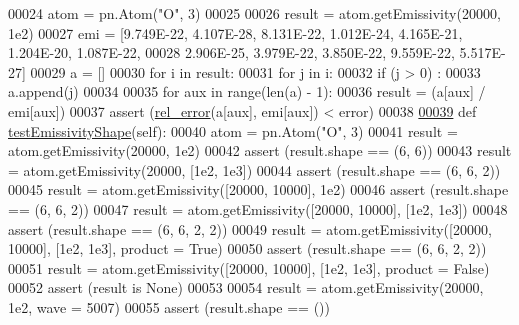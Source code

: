 \begin{DoxyCode}
00024                 atom = pn.Atom(\textcolor{stringliteral}{"O"}, 3)
00025 
00026                 result = atom.getEmissivity(20000, 1e2)
00027                 emi = [9.749E-22, 4.107E-28, 8.131E-22, 1.012E-24, 4.165E-21, 1.204E-20, 1.087E-22, 
00028                         2.906E-25, 3.979E-22, 3.850E-22, 9.559E-22, 5.517E-27]
00029                 a = []
00030                 \textcolor{keywordflow}{for} i \textcolor{keywordflow}{in} result:
00031                         \textcolor{keywordflow}{for} j \textcolor{keywordflow}{in} i:
00032                                 \textcolor{keywordflow}{if} (j > 0) :
00033                                         a.append(j)
00034 
00035                 \textcolor{keywordflow}{for} aux \textcolor{keywordflow}{in} range(len(a) - 1):
00036                         result = (a[aux] / emi[aux])
00037                         \textcolor{keyword}{assert} (\hyperlink{namespacepyneb_1_1test_1_1unit_test_aff3b7f847905c444d8b10727f10de236}{rel\_error}(a[aux], emi[aux]) < error)
00038         
\hypertarget{unit_test_8py_source_l00039}{}\hyperlink{classpyneb_1_1test_1_1unit_test_1_1_unit_test_ab23d15a37a34d1439ff2854ac602c8d1}{00039}         \textcolor{keyword}{def }\hyperlink{classpyneb_1_1test_1_1unit_test_1_1_unit_test_ab23d15a37a34d1439ff2854ac602c8d1}{testEmissivityShape}(self):
00040                 atom = pn.Atom(\textcolor{stringliteral}{"O"}, 3)
00041                 result = atom.getEmissivity(20000, 1e2)
00042                 \textcolor{keyword}{assert} (result.shape == (6, 6))
00043                 result = atom.getEmissivity(20000, [1e2, 1e3])
00044                 \textcolor{keyword}{assert} (result.shape == (6, 6, 2))
00045                 result = atom.getEmissivity([20000, 10000], 1e2)
00046                 \textcolor{keyword}{assert} (result.shape == (6, 6, 2))
00047                 result = atom.getEmissivity([20000, 10000], [1e2, 1e3])         
00048                 \textcolor{keyword}{assert} (result.shape == (6, 6, 2, 2))
00049                 result = atom.getEmissivity([20000, 10000], [1e2, 1e3], product = \textcolor{keyword}{True})         
00050                 \textcolor{keyword}{assert} (result.shape == (6, 6, 2, 2))
00051                 result = atom.getEmissivity([20000, 10000], [1e2, 1e3], product = \textcolor{keyword}{False})                
00052                 \textcolor{keyword}{assert} (result \textcolor{keywordflow}{is} \textcolor{keywordtype}{None})
00053                 
00054                 result = atom.getEmissivity(20000, 1e2, wave = 5007)
00055                 \textcolor{keyword}{assert} (result.shape == ())

\end{DoxyCode}
